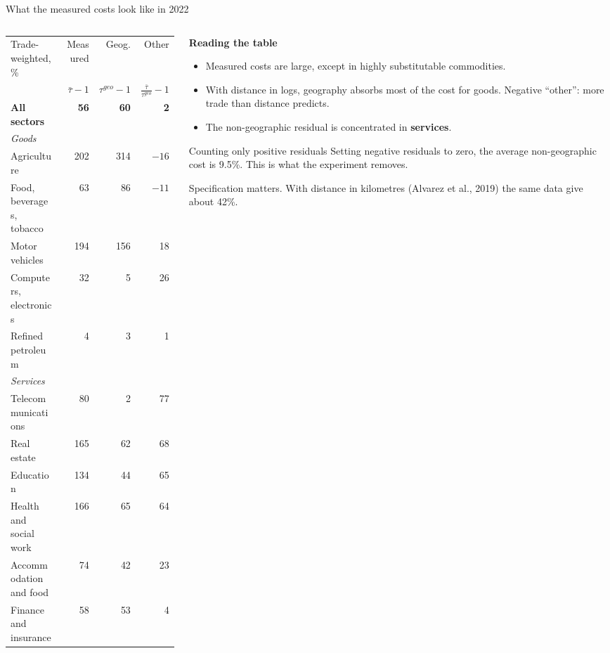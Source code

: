 \documentclass[aspectratio=169,9pt,t]{beamer}
\newcommand{\key}[1]{\textbf{\color{ipnavy}#1}}
\begin{document}
\begin{frame}{What the measured costs look like in 2022}
  \begin{columns}[T]
    \begin{column}{0.56\textwidth}
      \small
      \begin{tabular}{@{}lrrr@{}}
        \toprule
        Trade-weighted, \% & Measured & Geog. & Other\\
         & $\bar\tau-1$ & $\tau^{geo}-1$ & $\frac{\bar\tau}{\tau^{geo}}-1$\\
        \midrule
        \textbf{All sectors} & \textbf{56} & \textbf{60} & \textbf{2}\\
        \midrule
        \emph{Goods}\\
        Agriculture & 202 & 314 & $-16$\\
        Food, beverages, tobacco & 63 & 86 & $-11$\\
        Motor vehicles & 194 & 156 & 18\\
        Computers, electronics & 32 & 5 & 26\\
        Refined petroleum & 4 & 3 & 1\\
        \addlinespace[1pt]
        \emph{Services}\\
        Telecommunications & 80 & 2 & 77\\
        Real estate & 165 & 62 & 68\\
        Education & 134 & 44 & 65\\
        Health and social work & 166 & 65 & 64\\
        Accommodation and food & 74 & 42 & 23\\
        Finance and insurance & 58 & 53 & 4\\
        \bottomrule
      \end{tabular}
    \end{column}
    \begin{column}{0.4\textwidth}
      \textbf{Reading the table}
      \begin{itemize}
        \item Measured costs are large, except in highly substitutable
              commodities.
        \item With distance in logs, geography absorbs most of the
              cost for goods. Negative ``other'': more trade than
              distance predicts.
        \item The non-geographic residual is concentrated in
              \key{services}.
      \end{itemize}
      \begin{block}{Counting only positive residuals}
        \small Setting negative residuals to zero, the average
        non-geographic cost is 9.5\%. This is what the experiment
        removes.
      \end{block}
      {\footnotesize\alert{Specification matters.} With distance in
      kilometres (Alvarez et al., 2019) the same data give about 42\%.}
    \end{column}
  \end{columns}
\end{frame}
\end{document}
